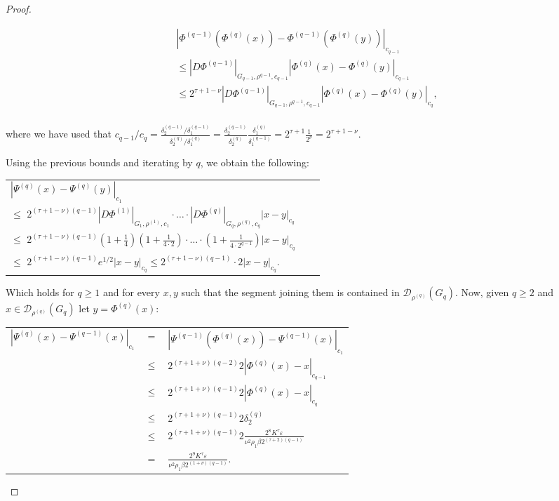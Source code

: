 \begin{proof}
\begin{enumerate}
$$
\begin{array}{lcl}
|\Phi^{(q-1)}(\Phi^{(q)}(x)) - \Phi^{(q-1)}(\Phi^{(q)}(y))|_{c_{q-1}} \\
  \leq  |D\Phi^{(q-1)}|_{G_{q-1},\rho^{q-1},c_{q-1}}|\Phi^{(q)}(x) - \Phi^{(q)}(y)|_{c_{q-1}}\\
  \leq  2^{\tau+1-\nu}|D\Phi^{(q-1)}|_{G_{q-1},\rho^{q-1},c_{q-1}}|\Phi^{(q)}(x) - \Phi^{(q)}(y)|_{c_{q}},\\
\end{array}
$$

where we have used that $c_{q-1}/c_q = \frac{\delta_2^{(q-1)}/\delta_1^{(q-1)}}{\delta_2^{(q)}/\delta_1^{(q)}} = \frac{\delta_2^{(q-1)}}{\delta_2^{(q)}}\frac{\delta_1^{(q)}}{\delta_1^{(q-1)}} = 2^{\tau+1}\frac{1}{2^\nu} = 2^{\tau+1-\nu}$.

Using the previous bounds and iterating by $q$, we obtain the following:

\begin{longtable}{lcl}
$|\Psi^{(q)}(x) - \Psi^{(q)}(y)|_{c_1}$ \\
 $\leq$  $2^{(\tau+1-\nu)(q-1)}|D\Phi^{(1)}|_{G_1,\rho^{(1)},c_1}\cdot\ldots\cdot|D\Phi^{(q)}|_{G_q,\rho^{(q)},c_q}|x-y|_{c_q}$ \\
 $\leq$  $2^{(\tau+1-\nu)(q-1)}(1+\frac{1}{4})(1+\frac{1}{4\cdot 2})\cdot\ldots\cdot(1 + \frac{1}{4\cdot 2^{q-1}})|x-y|_{c_q}$\\
 $\leq$  $2^{(\tau+1-\nu)(q-1)}e^{1/2}|x-y|_{c_q} \leq 2^{(\tau+1-\nu)(q-1)}\cdot 2|x-y|_{c_q}.$\\
\end{longtable}

Which holds for $q\geq 1$ and for every $x,y$ such that the segment joining them is contained in $\mathcal{D}_{\rho^{(q)}}(G_q)$. Now, given $q\geq 2$ and $x\in\mathcal{D}_{\rho^{(q)}}(G_q)$ let $y = \Phi^{(q)}(x)$:


\begin{longtable}{rcl}\label{eq:conv_can_trans2}
$|\Psi^{(q)}(x) - \Psi^{(q-1)}(x)|_{c_1}$ & $=$ & $|\Psi^{(q-1)}(\Phi^{(q)}(x)) - \Psi^{(q-1)}(x)|_{c_1}$ \\
& $\leq$ & $2^{(\tau+1+\nu)(q-2)}2|\Phi^{(q)}(x) - x|_{c_{q-1}}$\\
& $\leq$ & $2^{(\tau+1+\nu)(q-1)}2|\Phi^{(q)}(x) - x|_{c_{q}}$\\
& $\leq$ & $2^{(\tau+1+\nu)(q-1)}2\delta_2^{(q)}$\\
& $\leq$ & $2^{(\tau+1+\nu)(q-1)}2\frac{2^8 K^\tau \varepsilon}{\nu^2\rho_1\beta 2^{(\tau+2)(q-1)}}$\\
& $=$ & $\frac{2^9 K^\tau \varepsilon}{\nu^2 \rho_1 \beta 2^{(1+\nu)(q-1)}}.$\\
\end{longtable}


\end{enumerate}
\end{proof}
